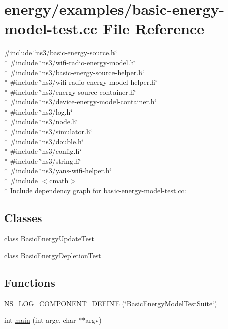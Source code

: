 \hypertarget{basic-energy-model-test_8cc}{}\section{energy/examples/basic-\/energy-\/model-\/test.cc File Reference}
\label{basic-energy-model-test_8cc}
{\ttfamily \#include \char`\"{}ns3/basic-\/energy-\/source.\+h\char`\"{}}\\*
{\ttfamily \#include \char`\"{}ns3/wifi-\/radio-\/energy-\/model.\+h\char`\"{}}\\*
{\ttfamily \#include \char`\"{}ns3/basic-\/energy-\/source-\/helper.\+h\char`\"{}}\\*
{\ttfamily \#include \char`\"{}ns3/wifi-\/radio-\/energy-\/model-\/helper.\+h\char`\"{}}\\*
{\ttfamily \#include \char`\"{}ns3/energy-\/source-\/container.\+h\char`\"{}}\\*
{\ttfamily \#include \char`\"{}ns3/device-\/energy-\/model-\/container.\+h\char`\"{}}\\*
{\ttfamily \#include \char`\"{}ns3/log.\+h\char`\"{}}\\*
{\ttfamily \#include \char`\"{}ns3/node.\+h\char`\"{}}\\*
{\ttfamily \#include \char`\"{}ns3/simulator.\+h\char`\"{}}\\*
{\ttfamily \#include \char`\"{}ns3/double.\+h\char`\"{}}\\*
{\ttfamily \#include \char`\"{}ns3/config.\+h\char`\"{}}\\*
{\ttfamily \#include \char`\"{}ns3/string.\+h\char`\"{}}\\*
{\ttfamily \#include \char`\"{}ns3/yans-\/wifi-\/helper.\+h\char`\"{}}\\*
{\ttfamily \#include $<$cmath$>$}\\*
Include dependency graph for basic-\/energy-\/model-\/test.cc\+:
\subsection*{Classes}
\begin{DoxyCompactItemize}
\item 
class \hyperlink{classBasicEnergyUpdateTest}{Basic\+Energy\+Update\+Test}
\item 
class \hyperlink{classBasicEnergyDepletionTest}{Basic\+Energy\+Depletion\+Test}
\end{DoxyCompactItemize}
\subsection*{Functions}
\begin{DoxyCompactItemize}
\item 
\hyperlink{basic-energy-model-test_8cc_a7e952cf7f58fb8e29d971c8b30c8db37}{N\+S\+\_\+\+L\+O\+G\+\_\+\+C\+O\+M\+P\+O\+N\+E\+N\+T\+\_\+\+D\+E\+F\+I\+NE} (\char`\"{}Basic\+Energy\+Model\+Test\+Suite\char`\"{})
\item 
int \hyperlink{basic-energy-model-test_8cc_a3c04138a5bfe5d72780bb7e82a18e627}{main} (int argc, char $\ast$$\ast$argv)
\end{DoxyCompactItemize}


